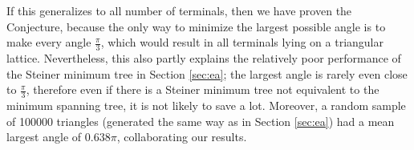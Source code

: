 \documentclass{mpaper}
\begin{document}
If this generalizes to all number of terminals, then we have proven the Conjecture, because the only way to minimize the largest possible angle is to make every angle $\frac{\pi}{3}$, which would result in all terminals lying on a triangular lattice. Nevertheless, this also partly explains the relatively poor performance of the Steiner minimum tree in Section \ref{sec:ea}; the largest angle is rarely even close to $\frac{\pi}{3}$, therefore even if there is a Steiner minimum tree not equivalent to the minimum spanning tree, it is not likely to save a lot. Moreover, a random sample of 100000 triangles (generated the same way as in Section \ref{sec:ea}) had a mean largest angle of $0.638\pi$, collaborating our results.
\end{document}
